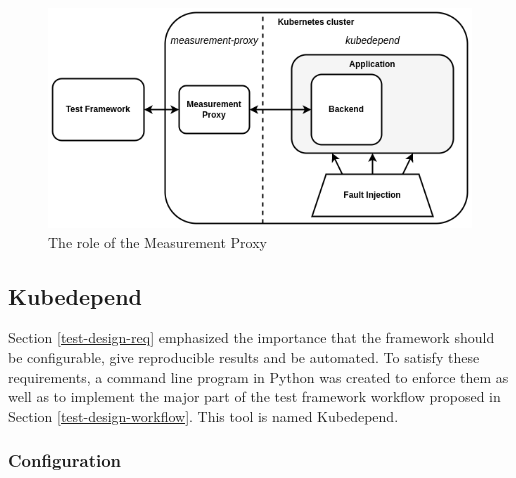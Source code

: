 \begin{figure}[h]
	\centering
	\includegraphics[width=140mm, keepaspectratio]{figures/measurement_proxy.png}
	\caption{The role of the Measurement Proxy}
	\label{fig:measurement_proxy}
\end{figure}

\subsection{Kubedepend}


Section \ref{test-design-req} emphasized the importance that the framework should be configurable, give reproducible results and be automated. To satisfy these requirements, a command line program in Python was created to enforce them as well as to implement the major part of the test framework workflow proposed in Section \ref{test-design-workflow}. This tool is named Kubedepend.

\subsubsection{Configuration}

